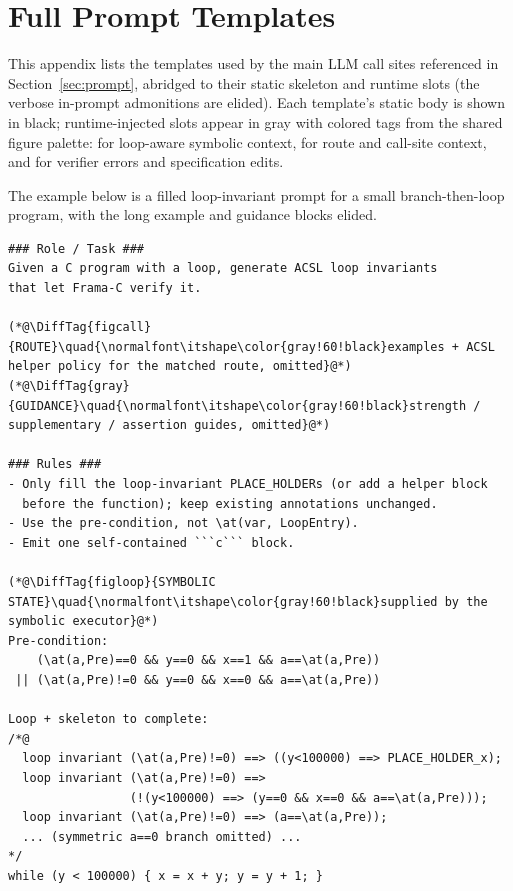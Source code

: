 \section{Full Prompt Templates}
\label{app:prompts}

This appendix lists the templates used by the main LLM call sites referenced in Section~\ref{sec:prompt}, abridged to their static skeleton and runtime slots (the verbose in-prompt admonitions are elided). Each template's static body is shown in black; runtime-injected slots appear in gray with colored tags from the shared figure palette:  for loop-aware symbolic context,  for route and call-site context, and  for verifier errors and specification edits.



The example below is a filled loop-invariant prompt for a small branch-then-loop program, with the long example and guidance blocks elided.

\begin{tcolorbox}[promptboxcompact, title={Loop-invariant generation prompt}]
\begin{lstlisting}[style=PromptInnerCompact]
### Role / Task ###
Given a C program with a loop, generate ACSL loop invariants
that let Frama-C verify it.

(*@\DiffTag{figcall}{ROUTE}\quad{\normalfont\itshape\color{gray!60!black}examples + ACSL helper policy for the matched route, omitted}@*)
(*@\DiffTag{gray}{GUIDANCE}\quad{\normalfont\itshape\color{gray!60!black}strength / supplementary / assertion guides, omitted}@*)

### Rules ###
- Only fill the loop-invariant PLACE_HOLDERs (or add a helper block
  before the function); keep existing annotations unchanged.
- Use the pre-condition, not \at(var, LoopEntry).
- Emit one self-contained ```c``` block.

(*@\DiffTag{figloop}{SYMBOLIC STATE}\quad{\normalfont\itshape\color{gray!60!black}supplied by the symbolic executor}@*)
Pre-condition:
    (\at(a,Pre)==0 && y==0 && x==1 && a==\at(a,Pre))
 || (\at(a,Pre)!=0 && y==0 && x==0 && a==\at(a,Pre))

Loop + skeleton to complete:
/*@
  loop invariant (\at(a,Pre)!=0) ==> ((y<100000) ==> PLACE_HOLDER_x);
  loop invariant (\at(a,Pre)!=0) ==>
                 (!(y<100000) ==> (y==0 && x==0 && a==\at(a,Pre)));
  loop invariant (\at(a,Pre)!=0) ==> (a==\at(a,Pre));
  ... (symmetric a==0 branch omitted) ...
*/
while (y < 100000) { x = x + y; y = y + 1; }
\end{lstlisting}
\end{tcolorbox}

